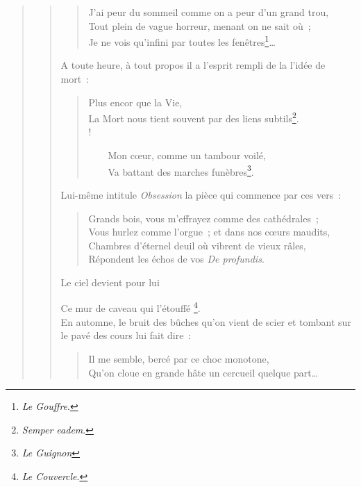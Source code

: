 \documentclass[french,twoside]{book} %
\begin{document}
\begin{verse}
\begin{verse}
\begin{verse}
J’ai peur du sommeil comme on a peur d’un grand trou,\\
Tout plein de vague horreur, menant on ne sait où ;\\
Je ne vois qu’infini par toutes les fenêtres\footnote{\emph{Le Gouffre}.}…\\
\end{verse}

\noindent A toute heure, à tout propos il a l’esprit rempli de la l’idée de mort :\par


\begin{verse}
Plus encor que la Vie,\\
La Mort nous tient souvent par des liens subtils\footnote{\emph{Semper eadem}.}.\\!

    Mon cœur, comme un tambour voilé,\\
    Va battant des marches funèbres\footnote{\emph{Le Guignon}}.\\
\end{verse}

\noindent Lui-même intitule \emph{Obsession} la pièce qui commence par ces vers :\par


\begin{verse}
Grands bois, vous m’effrayez comme des cathédrales ;\\
Vous hurlez comme l’orgue ; et dans nos cœurs maudits,\\
Chambres d’éternel deuil où vibrent de vieux râles,\\
Répondent les échos de vos \emph{De profundis}.\\
\end{verse}

\noindent Le ciel devient pour lui\par

Ce mur de caveau qui l’étouffé \footnote{\emph{Le Couvercle}.}.\\

\noindent En automne, le bruit des bûches qu’on vient de scier et tombant sur le pavé des cours lui fait dire :\par


\begin{verse}
Il me semble, bercé par ce choc monotone,\\
Qu’on cloue en grande hâte un cercueil quelque part…\\
\end{verse}


\end{verse}
\end{verse}
\end{document}
